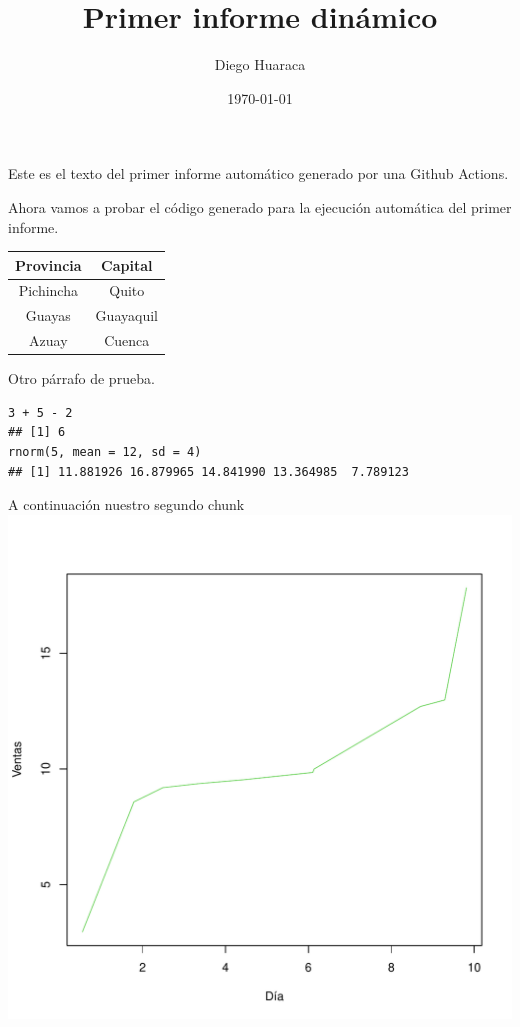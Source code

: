 \documentclass[12pt, a4paper]{book}\usepackage[]{graphicx}\usepackage[]{xcolor}
\title{Primer informe dinámico}
\author{Diego Huaraca}
\date{\today}
\makeatletter
\def\maxwidth{ %
  \ifdim\Gin@nat@width>\linewidth
    \linewidth
  \else
    \Gin@nat@width
  \fi
}
\newenvironment{kframe}{%
 \def\at@end@of@kframe{}%
 \ifinner\ifhmode%
  \def\at@end@of@kframe{\end{minipage}}%
  \begin{minipage}{\columnwidth}%
 \fi\fi%
 \def\FrameCommand##1{\hskip\@totalleftmargin \hskip-\fboxsep
 \colorbox{shadecolor}{##1}\hskip-\fboxsep
     \hskip-\linewidth \hskip-\@totalleftmargin \hskip\columnwidth}%
 \MakeFramed {\advance\hsize-\width
   \@totalleftmargin\z@ \linewidth\hsize
   \@setminipage}}%
 {\par\unskip\endMakeFramed%
 \at@end@of@kframe}
\newenvironment{knitrout}{}{} %
\makeatother
\begin{document}
\maketitle

Este es el texto del primer informe automático generado por una Github Actions.\newline

Ahora vamos a probar el código generado para la ejecución automática del primer informe.

\begin{table}[H]
\centering
\begin{tabular}{|c|c|}\hline
\textbf{Provincia} & \textbf{Capital}\\ \hline
Pichincha & Quito\\ \hline
Guayas & Guayaquil\\ \hline
Azuay & Cuenca\\ \hline
\end{tabular}
\end{table}

Otro párrafo de prueba.




\begin{knitrout}
\color{fgcolor}\begin{kframe}
\begin{verbatim}
3 + 5 - 2
## [1] 6
rnorm(5, mean = 12, sd = 4)
## [1] 11.881926 16.879965 14.841990 13.364985  7.789123
\end{verbatim}
\end{kframe}
\end{knitrout}

A continuación nuestro segundo chunk
\begin{knitrout}
\color{fgcolor}
\includegraphics[width=\maxwidth]{figure/chunk02-1.pdf} 
\end{knitrout}
\end{document}
